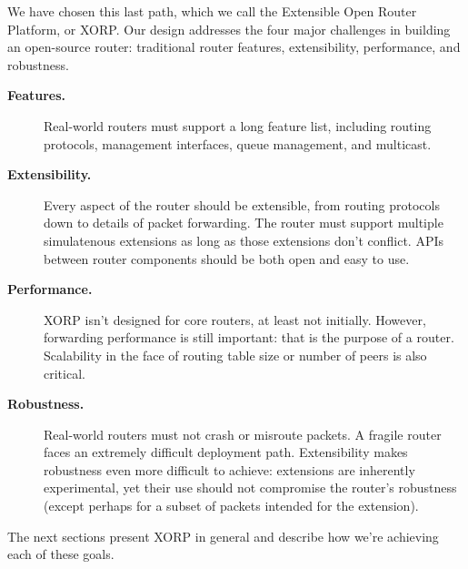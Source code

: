 We have chosen this last path, which we call the Extensible Open Router
Platform, or XORP.
Our design addresses the four major challenges in building an open-source
router: traditional router features,
extensibility, performance,  and robustness.

\begin{description}
\item[\textbf{Features.}] Real-world routers must support a long feature
list, including routing protocols, management interfaces, queue management,
and multicast.

\item[\textbf{Extensibility.}] Every aspect of the router should be
extensible, from routing protocols down to details of packet forwarding.
The router must support multiple simulatenous extensions as long as those
extensions don't conflict. APIs between router components should be both
open and easy to use.

\item[\textbf{Performance.}] XORP isn't designed for core routers, at least
not initially. However, forwarding performance is still important: that
is the purpose of a router.  Scalability in the face of routing table
size or number of peers is also critical.

\item[\textbf{Robustness.}] Real-world routers must not crash or misroute
packets. A fragile router faces an extremely difficult deployment path.
Extensibility makes robustness even more difficult to achieve: extensions
are inherently experimental, yet their use should not compromise the
router's robustness (except perhaps for a subset of packets intended for
the extension).

\end{description}

The next sections present XORP in general and describe how we're achieving
each of these goals.

